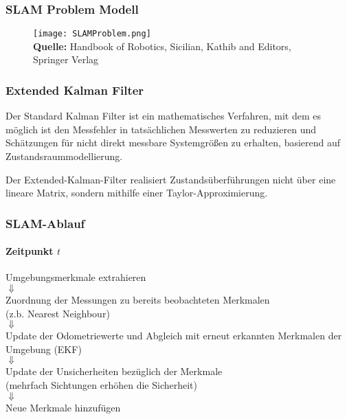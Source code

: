 \documentclass{beamer}
\begin{document}
\begin{frame}
\frametitle{SLAM Problem Modell}

 \begin{figure}[h]
\centering
 \texttt{[image: SLAMProblem.png]}\\
 \footnotesize\sffamily\textbf{Quelle:}  Handbook of Robotics, Sicilian, Kathib and Editors, Springer Verlag
 \end{figure}

\end{frame}

\begin{frame}
\frametitle{Extended Kalman Filter}
\begin{Definition}
Der Standard Kalman Filter ist ein mathematisches Verfahren, mit dem es möglich ist den Messfehler in tatsächlichen Messwerten zu reduzieren und Schätzungen für nicht direkt messbare Systemgrößen zu erhalten, basierend auf Zustandsraummodellierung.
\end{Definition}

\begin{Definition}
Der Extended-Kalman-Filter realisiert Zustandsüberführungen nicht über eine lineare Matrix, sondern mithilfe einer Taylor-Approximierung.
\end{Definition}

\end{frame}


\begin{frame}
\frametitle{SLAM-Ablauf}
\framesubtitle{Zeitpunkt $t$}

\begin{center}
Umgebungsmerkmale extrahieren \\
{\large $\Downarrow$}\\
Zuordnung der Messungen zu bereits beobachteten Merkmalen\\ (z.b. Nearest Neighbour)\\
{\large $\Downarrow$}\\
Update der Odometriewerte und Abgleich mit erneut erkannten Merkmalen der Umgebung (EKF)\\
{\large $\Downarrow$}\\
Update der Unsicherheiten bezüglich der Merkmale\\ (mehrfach Sichtungen erhöhen die Sicherheit)\\
{\large $\Downarrow$}\\
Neue Merkmale hinzufügen 
\end{center}
\end{frame}
\end{document}
